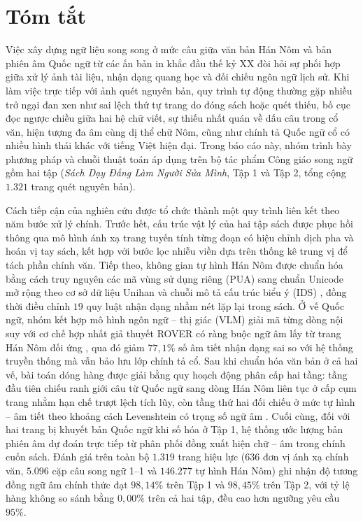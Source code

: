 \section*{Tóm tắt}

Việc xây dựng ngữ liệu song song ở mức câu giữa văn bản Hán Nôm và bản phiên âm Quốc ngữ từ các ấn bản in khắc đầu thế kỷ XX đòi hỏi sự phối hợp giữa xử lý ảnh tài liệu, nhận dạng quang học và đối chiếu ngôn ngữ lịch sử. Khi làm việc trực tiếp với ảnh quét nguyên bản, quy trình tự động thường gặp nhiều trở ngại đan xen như sai lệch thứ tự trang do đóng sách hoặc quét thiếu, bố cục đọc ngược chiều giữa hai hệ chữ viết, sự thiếu nhất quán về dấu câu trong cổ văn, hiện tượng đa âm cùng dị thể chữ Nôm, cũng như chính tả Quốc ngữ cổ có nhiều hình thái khác với tiếng Việt hiện đại. Trong báo cáo này, nhóm trình bày phương pháp và chuỗi thuật toán áp dụng trên bộ tác phẩm Công giáo song ngữ gồm hai tập (\textit{Sách Dạy Đấng Làm Người Sửa Mình}, Tập 1 và Tập 2, tổng cộng $1.321$ trang quét nguyên bản).

Cách tiếp cận của nghiên cứu được tổ chức thành một quy trình liên kết theo năm bước xử lý chính. Trước hết, cấu trúc vật lý của hai tập sách được phục hồi thông qua mô hình ánh xạ trang tuyến tính từng đoạn có hiệu chỉnh dịch pha và hoán vị tay sách, kết hợp với bước lọc nhiễu viền dựa trên thống kê trung vị để tách phần chính văn. Tiếp theo, không gian tự hình Hán Nôm được chuẩn hóa bằng cách truy nguyên các mã vùng sử dụng riêng (PUA) sang chuẩn Unicode mở rộng theo cơ sở dữ liệu Unihan và chuỗi mô tả cấu trúc biểu ý (IDS) \cite{unihan2025,morioka2008ids}, đồng thời điều chỉnh $19$ quy luật nhận dạng nhầm nét lặp lại trong sách. Ở vế Quốc ngữ, nhóm kết hợp mô hình ngôn ngữ -- thị giác (VLM) giải mã từng dòng nội suy với cơ chế hợp nhất giả thuyết ROVER có ràng buộc ngữ âm lấy từ trang Hán Nôm đối ứng \cite{fiscus1997rover,bai2025qwenvl}, qua đó giảm $77{,}1\%$ số âm tiết nhận dạng sai so với hệ thống truyền thống mà vẫn bảo lưu lớp chính tả cổ. Sau khi chuẩn hóa văn bản ở cả hai vế, bài toán dóng hàng được giải bằng quy hoạch động phân cấp hai tầng: tầng đầu tiên chiếu ranh giới câu từ Quốc ngữ sang dòng Hán Nôm liên tục ở cấp cụm trang nhằm hạn chế trượt lệch tích lũy, còn tầng thứ hai đối chiếu ở mức tự hình -- âm tiết theo khoảng cách Levenshtein có trọng số ngữ âm \cite{levenshtein1966}. Cuối cùng, đối với hai trang bị khuyết bản Quốc ngữ khi số hóa ở Tập 1, hệ thống ước lượng bản phiên âm dự đoán trực tiếp từ phân phối đồng xuất hiện chữ -- âm trong chính cuốn sách. Đánh giá trên toàn bộ $1.319$ trang hiệu lực ($636$ đơn vị ánh xạ chính văn, $5.096$ cặp câu song ngữ 1--1 và $146.277$ tự hình Hán Nôm) ghi nhận độ tương đồng ngữ âm chính thức đạt $98{,}14\%$ trên Tập 1 và $98{,}45\%$ trên Tập 2, với tỷ lệ hàng không so sánh bằng $0{,}00\%$ trên cả hai tập, đều cao hơn ngưỡng yêu cầu $95\%$.

